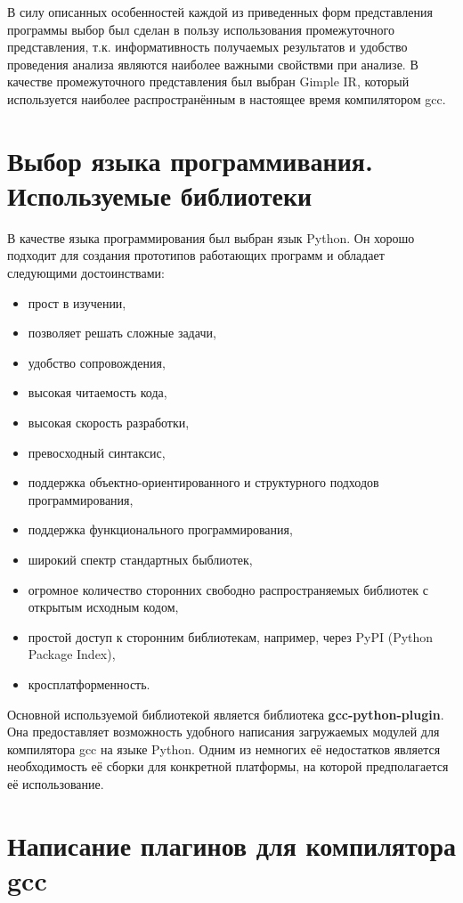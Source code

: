 В силу описанных особенностей каждой из приведенных форм представления программы выбор был сделан в пользу использования промежуточного представления, т.к. информативность получаемых результатов и удобство проведения анализа являются наиболее важными свойствми при анализе. В качестве промежуточного представления был выбран Gimple IR, который используется наиболее распространённым в настоящее время компилятором gcc. 

\section{Выбор языка программивания. Используемые библиотеки}

В качестве языка программирования был выбран язык Python. Он хорошо подходит для создания прототипов работающих программ и обладает следующими достоинствами:
\begin{itemize}
  \item прост в изучении,
  \item позволяет решать сложные задачи,
  \item удобство сопровождения,
  \item высокая читаемость кода,
  \item высокая скорость разработки,
  \item превосходный синтаксис,
  \item поддержка объектно-ориентированного и структурного подходов программирования,
  \item поддержка функционального программирования,
  \item широкий спектр стандартных быблиотек,
  \item огромное количество сторонних свободно распространяемых библиотек с открытым исходным кодом,
  \item простой доступ к сторонним библиотекам, например, через PyPI (Python Package Index),
  \item кросплатформенность.
\end{itemize}

Основной используемой библиотекой является библиотека \textbf{gcc-python-plugin}. Она предоставляет возможность удобного написания загружаемых модулей для компилятора gcc на языке Python. Одним из немногих её недостатков является необходимость её сборки для конкретной платформы, на которой предполагается её использование.

\section{Написание плагинов для компилятора gcc}

